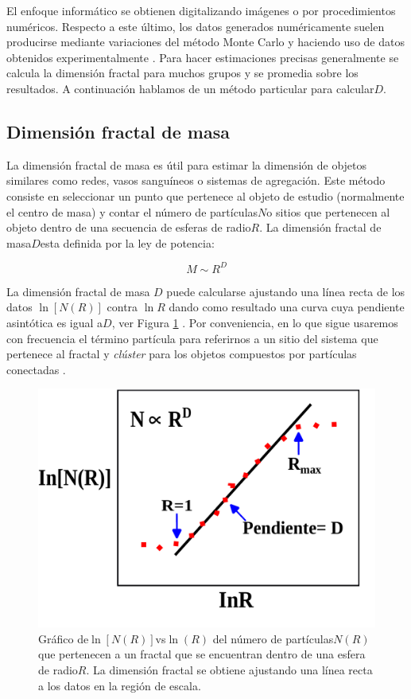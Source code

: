 El enfoque inform\'{a}tico se obtienen digitalizando im\'{a}genes o por procedimientos num\'{e}ricos. Respecto a este \'{u}ltimo, los datos generados num\'{e}ricamente suelen producirse mediante variaciones del m\'{e}todo Monte Carlo y haciendo uso de datos obtenidos experimentalmente \cite{Vicsek1992}. Para hacer estimaciones precisas generalmente se calcula la dimensi\'{o}n fractal para muchos grupos y se promedia sobre los resultados. A continuaci\'{o}n hablamos de un m\'{e}todo particular para calcular$D$.

\subsection{Dimensi\'{o}n fractal de masa}
\label{masa-radio}

La dimensi\'{o}n fractal de masa es \'{u}til para estimar la dimensi\'{o}n de objetos similares como redes, vasos sangu\'{i}neos o sistemas de agregaci\'{o}n. Este m\'{e}todo consiste en seleccionar un punto que pertenece al objeto de estudio (normalmente el centro de masa) y contar el n\'{u}mero de part\'{i}culas$N$o sitios que pertenecen al objeto dentro de una secuencia de esferas de radio$R$. La dimensi\'{o}n fractal de masa$D$esta definida por la ley de potencia:

\begin{equation}
	M \sim R^{D}
\end{equation}


La dimensi\'{o}n fractal de masa $D$ puede calcularse ajustando una l\'{i}nea recta de los datos $\ln[N(R)]$ contra $\ln R$ dando como resultado una curva cuya pendiente asint\'{o}tica es igual a$D$, ver Figura \ref{fig:D-Fractal} . Por conveniencia, en lo que sigue usaremos con frecuencia el t\'{e}rmino part\'{i}cula para referirnos a un sitio del sistema que pertenece al fractal y \textit{cl\'{u}ster} para los objetos compuestos por part\'{i}culas conectadas \cite{Vicsek1992}.


\begin{figure}[H]
	\begin{center}
		\includegraphics[width=0.5\linewidth]{graphs/dimension-fractal}
		\caption{Gr\'{a}fico de$\ln[N(R)]$vs$\ln (R)$ del n\'{u}mero de part\'{i}culas$N(R)$que pertenecen a un fractal que se encuentran dentro de una esfera de radio$R$. La dimensi\'{o}n fractal se obtiene ajustando una l\'{i}nea recta a los datos en la regi\'{o}n de escala.}
		\label{fig:D-Fractal}
	\end{center}
\end{figure}


